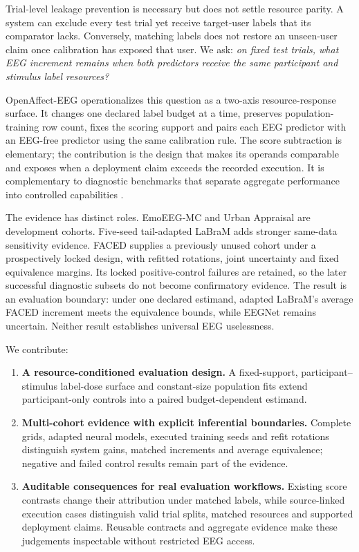 \documentclass{article}
\begin{document}
Trial-level leakage prevention is necessary but does not settle resource
parity. A system can exclude every test trial yet receive target-user labels
that its comparator lacks. Conversely, matching labels does not restore an
unseen-user claim once calibration has exposed that user. We ask:
\emph{on fixed test trials, what EEG increment remains when both predictors
receive the same participant and stimulus label resources?}

OpenAffect-EEG operationalizes this question as a two-axis resource-response
surface. It changes one declared label budget at a time, preserves
population-training row count, fixes the scoring support and pairs each EEG
predictor with an EEG-free predictor using the same calibration rule. The
score subtraction is elementary; the contribution is the design that makes
its operands comparable and exposes when a deployment claim exceeds the
recorded execution. It is complementary to diagnostic benchmarks that separate
aggregate performance into controlled capabilities \citep{radevski2025dave}.

The evidence has distinct roles. EmoEEG-MC and Urban Appraisal are development
cohorts. Five-seed tail-adapted LaBraM adds stronger same-data sensitivity
evidence. FACED supplies a previously unused cohort under a prospectively
locked design, with refitted rotations, joint uncertainty and fixed equivalence
margins. Its locked positive-control failures are retained, so the later
successful diagnostic subsets do not become confirmatory evidence. The result
is an evaluation boundary: under one declared estimand, adapted LaBraM's
average FACED increment meets the equivalence bounds, while EEGNet remains
uncertain. Neither result establishes universal EEG uselessness.

We contribute:
\begin{enumerate}
\item \textbf{A resource-conditioned evaluation design.} A fixed-support,
participant--stimulus label-dose surface and constant-size population fits
extend participant-only controls into a paired budget-dependent estimand.
\item \textbf{Multi-cohort evidence with explicit inferential boundaries.}
Complete grids, adapted neural models, executed training seeds and refit
rotations distinguish system gains, matched increments and average equivalence;
negative and failed control results remain part of the evidence.
\item \textbf{Auditable consequences for real evaluation workflows.}
Existing score contrasts change their attribution under matched labels, while
source-linked execution cases distinguish valid trial splits, matched resources
and supported deployment claims. Reusable contracts and aggregate evidence
make these judgements inspectable without restricted EEG access.
\end{enumerate}
\end{document}
